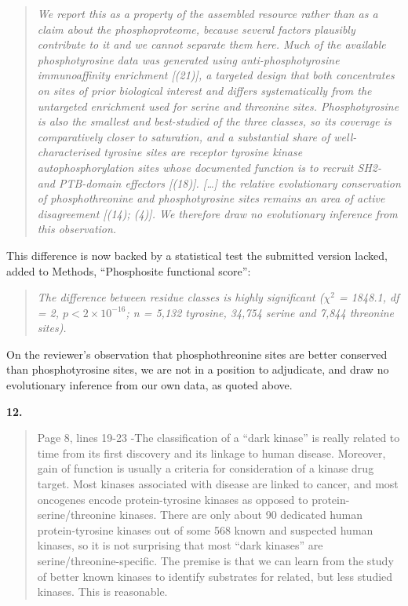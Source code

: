 \documentclass[
]{article}
\begin{document}
\begin{quote}
\emph{We report this as a property of the assembled resource rather than
as a claim about the phosphoproteome, because several factors plausibly
contribute to it and we cannot separate them here. Much of the available
phosphotyrosine data was generated using anti-phosphotyrosine
immunoaffinity enrichment {[}(21){]}, a targeted design that both
concentrates on sites of prior biological interest and differs
systematically from the untargeted enrichment used for serine and
threonine sites. Phosphotyrosine is also the smallest and best-studied
of the three classes, so its coverage is comparatively closer to
saturation, and a substantial share of well-characterised tyrosine sites
are receptor tyrosine kinase autophosphorylation sites whose documented
function is to recruit SH2- and PTB-domain effectors {[}(18){]}.
{[}\ldots{]} the relative evolutionary conservation of phosphothreonine
and phosphotyrosine sites remains an area of active disagreement
{[}(14); (4){]}. We therefore draw no evolutionary inference from this
observation.}
\end{quote}

This difference is now backed by a statistical test the submitted
version lacked, added to Methods, ``Phosphosite functional score'':

\begin{quote}
\emph{The difference between residue classes is highly significant
(\(\chi^2\) = 1848.1, df = 2, \(p < 2 \times 10^{-16}\); n = 5,132
tyrosine, 34,754 serine and 7,844 threonine sites).}
\end{quote}

On the reviewer's observation that phosphothreonine sites are better
conserved than phosphotyrosine sites, we are not in a position to
adjudicate, and draw no evolutionary inference from our own data, as
quoted above.

\textbf{12.}

\begin{quote}
Page 8, lines 19-23 -The classification of a ``dark kinase'' is really
related to time from its first discovery and its linkage to human
disease. Moreover, gain of function is usually a criteria for
consideration of a kinase drug target. Most kinases associated with
disease are linked to cancer, and most oncogenes encode protein-tyrosine
kinases as opposed to protein-serine/threonine kinases. There are only
about 90 dedicated human protein-tyrosine kinases out of some 568 known
and suspected human kinases, so it is not surprising that most ``dark
kinases'' are serine/threonine-specific. The premise is that we can
learn from the study of better known kinases to identify substrates for
related, but less studied kinases. This is reasonable.
\end{quote}
\end{document}
